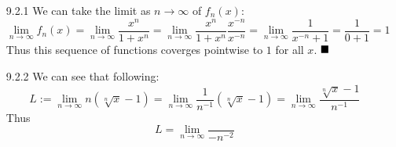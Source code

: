 \documentclass[11pt]{article}
\newcommand{\done}{\ensuremath{
    \strut\hfill\blacksquare
}}
\newcommand{\parens}[1]{\left(#1\right)}             %
\newcommand{\lm}[1]{\displaystyle\lim_{#1}}
\begin{document}
\pagestyle{fancy}
\fancyhead{}

\normalsize

\begin{itemize}
    \item [9.2.1] We can take the limit as $n\to\infty$ of $f_n(x)$:
    \[\lm{n\to\infty}f_n(x)=\lm{n\to\infty}\frac{x^n}{1+x^n}=\lm{n\to\infty}\frac{x^n}{1+x^n}\frac{x^{-n}}{x^{-n}}=\lm{n\to\infty}\frac{1}{x^{-n}+1}=\frac{1}{0+1}=1\]
    Thus this sequence of functions coverges pointwise to $1$ for all $x$. \done

    \item [9.2.2] We can see that following:
    \[L:=\lm{n\to\infty}n\parens{\sqrt[n]{x}-1}=\lm{n\to\infty}\frac{1}{n^{-1}}\parens{\sqrt[n]{x}-1}=\lm{n\to\infty}\frac{\sqrt[n]{x}-1}{n^{-1}}\]
    Thus
    \[L=\lm{n\to\infty}\frac{}{-n^{-2}}\]
\end{itemize}
\end{document}
